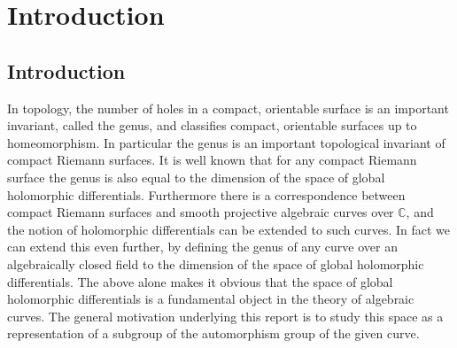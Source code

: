 \chapter{Introduction} \label{Chapter:introduction}

\section{Introduction}

In topology, the number of holes in a compact, orientable surface is an important invariant, called the genus, and classifies compact, orientable surfaces up to homeomorphism.
In particular the genus is an important topological invariant of compact Riemann surfaces.
It is well known that for any compact Riemann surface the genus is also equal to the dimension of the space of global holomorphic differentials.
Furthermore there is a correspondence between compact Riemann surfaces and smooth projective algebraic curves over $\mathbb C$, and the notion of holomorphic differentials can be extended to such curves.
In fact we can extend this even further, by defining the genus of any curve over an algebraically closed field to the dimension of the space of global holomorphic differentials.
The above alone makes it obvious that the space of global holomorphic differentials is a fundamental object in the theory of algebraic curves.
The general motivation underlying this report is to study this space as a representation of a subgroup of the automorphism group of the given curve.

